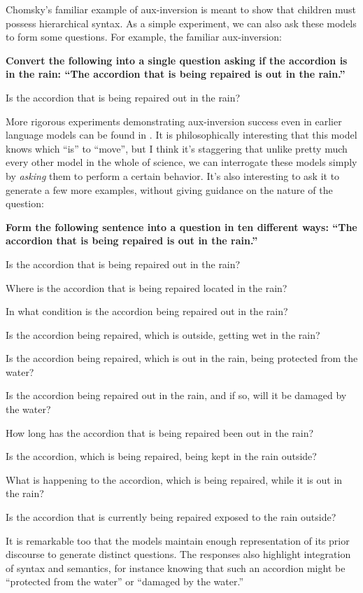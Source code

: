 \documentclass[output=paper,colorlinks,citecolor=brown
]{langscibook}
\begin{document}
Chomsky's familiar example of aux-inversion is meant to show that children must possess hierarchical syntax. As a simple experiment, we can also ask these models to form some questions. For example, the familiar aux-inversion:
\begin{myquote}
\textbf{Convert the following into a single question asking if the accordion is in the rain: ``The accordion that is being repaired is out in the rain.''}

Is the accordion that is being repaired out in the rain?
\end{myquote}
\noindent More rigorous experiments demonstrating aux-inversion success even in earlier language models can be found in \cite{warstadt2020can}. It is philosophically interesting that this model knows which ``is'' to ``move'', but I think it's staggering that unlike pretty much every other model in the whole of science, we can interrogate these models simply by \emph{asking} them to perform a certain behavior. It's also interesting to ask it to generate a few more examples, without giving guidance on the nature of the question:
\begin{myquote}
\textbf{Form the following sentence into a question in ten different ways: ``The accordion that is being repaired is out in the rain.''}

Is the accordion that is being repaired out in the rain?

Where is the accordion that is being repaired located in the rain?

In what condition is the accordion being repaired out in the rain?

Is the accordion being repaired, which is outside, getting wet in the rain?

Is the accordion being repaired, which is out in the rain, being protected from the water?

Is the accordion being repaired out in the rain, and if so, will it be damaged by the water?

How long has the accordion that is being repaired been out in the rain?

Is the accordion, which is being repaired, being kept in the rain outside?

What is happening to the accordion, which is being repaired, while it is out in the rain?

Is the accordion that is currently being repaired exposed to the rain outside?
\end{myquote}
\noindent It is remarkable too that the models maintain enough representation of its prior discourse to generate distinct questions. The responses also highlight integration of syntax and semantics, for instance knowing that such an accordion might be ``protected from the water'' or ``damaged by the water.'' 
\end{document}
